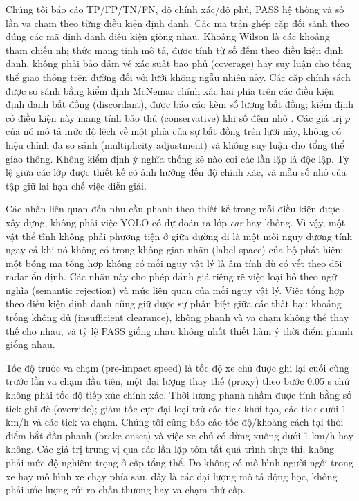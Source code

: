 \documentclass[conference]{IEEEtran}
\begin{document}
Chúng tôi báo cáo TP/FP/TN/FN, độ chính xác/độ phủ, PASS hệ thống và số lần
va chạm theo từng điều kiện định danh. Các ma trận ghép cặp đối sánh theo đúng
các mã định danh điều kiện giống nhau. Khoảng Wilson \cite{wilson1927} là các
khoảng tham chiếu nhị thức mang tính mô tả, được tính từ số đếm theo điều kiện
định danh, không phải bảo đảm về xác suất bao phủ (coverage) hay suy luận cho
tổng thể giao thông trên đường đối với lưới không ngẫu nhiên này. Các cặp
chính sách được so sánh bằng kiểm định McNemar chính xác hai phía
\cite{mcnemar1947} trên các điều kiện định danh bất đồng (discordant), được
báo cáo kèm số lượng bất đồng; kiểm định có điều kiện này mang tính bảo thủ
(conservative) khi số đếm nhỏ \cite{fagerland2013mcnemar}. Các giá trị $p$ của
nó mô tả mức độ lệch về một phía của sự bất đồng trên lưới này, không có hiệu
chỉnh đa so sánh (multiplicity adjustment) và không suy luận cho tổng thể giao
thông. Không kiểm định ý nghĩa thống kê nào coi các lần lặp là độc lập. Tỷ lệ
giữa các lớp được thiết kế có ảnh hưởng đến độ chính xác, và mẫu số nhỏ của
tập giữ lại hạn chế việc diễn giải.

Các nhãn liên quan đến nhu cầu phanh theo thiết kế trong mỗi điều kiện được
xây dựng, không phải việc YOLO có dự đoán ra lớp \emph{car} hay không. Vì vậy,
một vật thể tĩnh không phải phương tiện ở giữa đường đi là một mối nguy dương
tính ngay cả khi nó không có trong không gian nhãn (label space) của bộ phát
hiện; một bóng ma tổng hợp không có mối nguy vật lý là âm tính dù có vết theo
dõi radar ổn định. Các nhãn này cho phép đánh giá riêng rẽ việc loại bỏ theo
ngữ nghĩa (semantic rejection) và mức liên quan của mối nguy vật lý. Việc tổng
hợp theo điều kiện định danh cũng giữ được sự phân biệt giữa các thất bại:
khoảng trống không đủ (insufficient clearance), không phanh và va chạm không
thể thay thế cho nhau, và tỷ lệ PASS giống nhau không nhất thiết hàm ý thời
điểm phanh giống nhau.

Tốc độ trước va chạm (pre-impact speed) là tốc độ xe chủ được ghi lại cuối
cùng trước lần va chạm đầu tiên, một đại lượng thay thế (proxy) theo bước
0.05 s chứ không phải tốc độ tiếp xúc chính xác. Thời lượng phanh nhầm được
tính bằng số tick ghi đè (override); giảm tốc cực đại loại trừ các tick khởi
tạo, các tick dưới 1 km/h và các tick va chạm. Chúng tôi cũng báo cáo tốc
độ/khoảng cách tại thời điểm bắt đầu phanh (brake onset) và việc xe chủ có dừng xuống dưới
1 km/h hay không. Các giá trị trung vị qua các lần lặp tóm tắt quá trình thực
thi, không phải mức độ nghiêm trọng ở cấp tổng thể. Do không có mô hình người
ngồi trong xe hay mô hình xe chạy phía sau, đây là các đại lượng mô tả động
học, không phải ước lượng rủi ro chấn thương hay va chạm thứ cấp.
\end{document}
